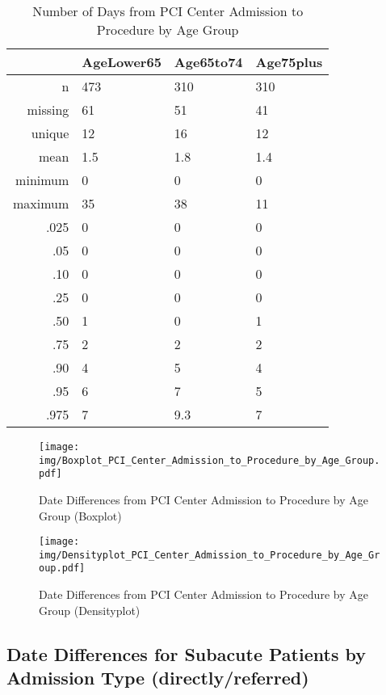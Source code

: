 \documentclass[a4paper]{report}
\begin{document}
\begin{itemize}
{%
\begin{table}[ht]
\centering
\begin{tabular}{rlll}
  \toprule
 & AgeLower65 & Age65to74 & Age75plus \\ 
  \midrule
n & 473 & 310 & 310 \\ 
  missing & 61 & 51 & 41 \\ 
  unique & 12 & 16 & 12 \\ 
  mean & 1.5 & 1.8 & 1.4 \\ 
  minimum & 0 & 0 & 0 \\ 
  maximum & 35 & 38 & 11 \\ 
  .025 & 0 & 0 & 0 \\ 
  .05 & 0 & 0 & 0 \\ 
  .10 & 0 & 0 & 0 \\ 
  .25 & 0 & 0 & 0 \\ 
  .50 & 1 & 0 & 1 \\ 
  .75 & 2 & 2 & 2 \\ 
  .90 & 4 & 5 & 4 \\ 
  .95 & 6 & 7 & 5 \\ 
  .975 & 7 & 9.3 & 7 \\ 
   \bottomrule
\end{tabular}
\caption{Number of Days from PCI Center Admission to Procedure by Age Group} 
\end{table}
\begin{figure}
  \centering
  \caption{Date Differences from PCI Center Admission to Procedure by Age Group (Boxplot)}
  \label{Boxplot: Date Differences from PCI Center Admission to Procedure by Age Group}
\texttt{[image: img/Boxplot\_PCI\_Center\_Admission\_to\_Procedure\_by\_Age\_Group.pdf]}\end{figure}


\begin{figure}
  \centering
  \caption{Date Differences from PCI Center Admission to Procedure by Age Group (Densityplot)}
  \label{Density: Date Differences from PCI Center Admission to Procedure by Age Group}
\texttt{[image: img/Densityplot\_PCI\_Center\_Admission\_to\_Procedure\_by\_Age\_Group.pdf]}\end{figure}





\clearpage
\subsection{Date Differences for Subacute Patients by Admission Type (directly/referred)}


}
\end{itemize}
\end{document}
